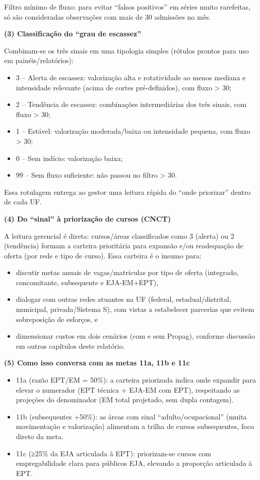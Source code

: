 Filtro mínimo de fluxo: para evitar ``falsos positivos'' em séries muito rarefeitas, só são consideradas observações com mais de 30 admissões no mês.

\textbf{(3) Classificação do ``grau de escassez''}

Combinam-se os três sinais em uma tipologia simples (rótulos prontos para uso em painéis/relatórios):

\begin{itemize}
	\item 3 – Alerta de escassez: valorização alta e rotatividade ao menos mediana e intensidade relevante (acima de cortes pré-definidos), com fluxo > 30;
	\item 2 – Tendência de escassez: combinações intermediárias dos três sinais, com fluxo > 30;
	\item 1 – Estável: valorização moderada/baixa ou intensidade pequena, com fluxo > 30;
	\item 0 – Sem indício: valorização baixa;
	\item 99 – Sem fluxo suficiente: não passou no filtro > 30.
\end{itemize}

Essa rotulagem entrega ao gestor uma leitura rápida do ``onde priorizar'' dentro de cada UF.

\textbf{(4) Do ``sinal'' à priorização de cursos (CNCT)}

A leitura gerencial é direta: cursos/áreas classificados como 3 (alerta) ou 2 (tendência) formam a carteira prioritária para expansão e/ou readequação de oferta (por rede e tipo de curso). Essa carteira é o insumo para:

\begin{itemize}
	\item discutir metas anuais de vagas/matrículas por tipo de oferta (integrado, concomitante, subsequente e EJA-EM+EPT),
	\item dialogar com outras redes atuantes na UF (federal, estadual/distrital, municipal, privada/Sistema S), com vistas a estabelecer parcerias que evitem sobreposição de esforços, e
	\item dimensionar custos em dois cenários (com e sem Propag), conforme discussão em outros capítulos deste relatório.
\end{itemize}

\textbf{(5) Como isso conversa com as metas 11a, 11b e 11c}

\begin{itemize}
	\item 11a (razão EPT/EM = 50\%): a carteira priorizada indica onde expandir para elevar o numerador (EPT técnica + EJA-EM com EPT), respeitando as projeções do denominador (EM total projetado, sem dupla contagem).
	\item 11b (subsequentes +50\%): as áreas com sinal ``adulto/ocupacional'' (muita movimentação e valorização) alimentam a trilha de cursos subsequentes, foco direto da meta.
	\item 11c (≥25\% da EJA articulada à EPT): priorizam-se cursos com empregabilidade clara para públicos EJA, elevando a proporção articulada à EPT.
\end{itemize}

